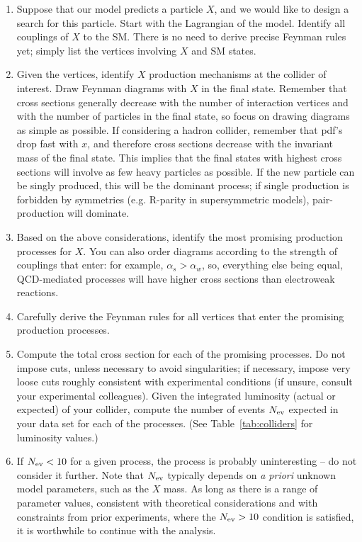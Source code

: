\documentclass{ws-procs9x6}
\begin{document}
\begin{enumerate}

\item Suppose that our model predicts a particle $X$, and we would like to design a search for this particle. Start with the Lagrangian of the model. Identify all couplings of $X$ to the SM. There is no need to derive precise Feynman rules yet; simply list the vertices involving $X$ and SM states. 

\item Given the vertices, identify $X$ production mechanisms at the collider of interest. Draw Feynman diagrams with $X$ in the final state. Remember that cross sections generally decrease with the number of interaction vertices and with the number of particles in the final state, so focus on drawing diagrams as simple as possible. If considering a hadron collider, remember that pdf's drop fast with $x$, and therefore cross sections decrease with the invariant mass of the final state. This implies that the final states with highest cross sections will involve as few heavy particles as possible. If the new particle can be singly produced, this will be the dominant process; if single production is forbidden by symmetries (e.g. R-parity in supersymmetric models), pair-production will dominate. 

\item Based on the above considerations, identify the most promising production processes for $X$. You can also order diagrams according to the strength of couplings that enter: for example, $\alpha_s>\alpha_w$, so, everything else being equal, QCD-mediated processes will have higher cross sections than electroweak reactions.

\item Carefully derive the Feynman rules for all vertices that enter the promising production processes. 

\item Compute the total cross section for each of the promising processes. Do not impose cuts, unless necessary to avoid singularities; if necessary, impose very loose cuts roughly consistent with experimental conditions (if unsure, consult your experimental colleagues). Given the integrated luminosity (actual or expected) of your collider, compute the number of events $N_{\rm ev}$ expected in your data set for each of the processes. (See Table~\ref{tab:colliders} for luminosity values.)

\item If $N_{\rm ev}<10$ for a given process, the process is probably uninteresting -- do not consider it further. Note that $N_{\rm ev}$ typically depends on {\it a priori} unknown model parameters, such as the $X$ mass. As long as there is a range of parameter values, consistent with theoretical considerations and with constraints from prior experiments, where the $N_{\rm ev}>10$ condition is satisfied, it is worthwhile to continue with the analysis. 


\end{enumerate}
\end{document}
